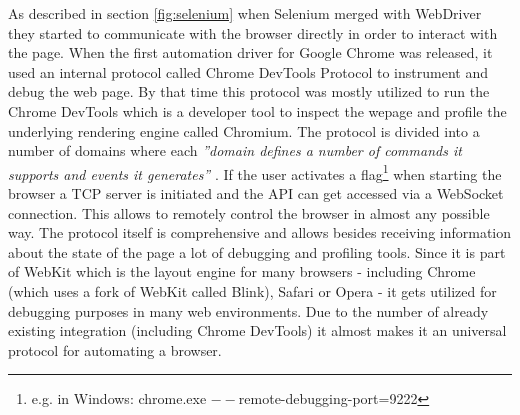 As described in section \ref{fig:selenium} when Selenium merged with WebDriver they started
to communicate with the browser directly in order to interact with the page. When the first
automation driver for Google Chrome was released, it used an internal protocol called Chrome
DevTools Protocol to instrument and debug the web page. By that time this protocol was mostly
utilized to run the Chrome DevTools which is a developer tool to inspect the wepage and profile
the underlying rendering engine called Chromium. The protocol is divided into a number of
domains where each \textit{''domain defines a number of commands it supports and events it
generates''} \cite{devtoolsprotocol}. If the user activates a flag\footnote{e.g. in Windows:
chrome.exe $--$remote-debugging-port=9222} when starting the browser a TCP server is initiated
and the API can get accessed via a WebSocket connection. This allows to remotely control the
browser in almost any possible way. The protocol itself is comprehensive and allows besides
receiving information about the state of the page a lot of debugging and profiling tools. Since
it is part of WebKit which is the layout engine for many browsers - including Chrome (which
uses a fork of WebKit called Blink), Safari or Opera - it gets utilized for debugging purposes
in many web environments. Due to the number of already existing integration (including Chrome
DevTools) it almost makes it an universal protocol for automating a browser.
